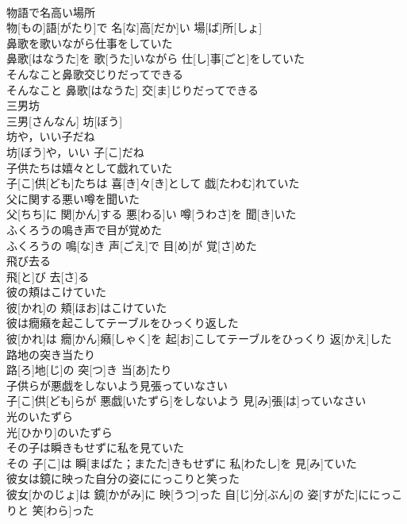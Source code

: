 \documentclass[8pt]{extreport}
\begin{document}
\begin{CJK}{UTF8}{min}
\\	物語で名高い場所	
\\	物[もの]語[がたり]で 名[な]高[だか]い 場[ば]所[しょ]
\\	鼻歌を歌いながら仕事をしていた	
\\	鼻歌[はなうた]を 歌[うた]いながら 仕[し]事[ごと]をしていた
\\	そんなこと鼻歌交じりだってできる	
\\	そんなこと 鼻歌[はなうた] 交[ま]じりだってできる
\\	三男坊	
\\	三男[さんなん] 坊[ぼう]
\\	坊や，いい子だね	
\\	坊[ぼう]や，いい 子[こ]だね
\\	子供たちは嬉々として戯れていた	
\\	子[こ]供[ども]たちは 喜[き]々[き]として 戯[たわむ]れていた
\\	父に関する悪い噂を聞いた	
\\	父[ちち]に 関[かん]する 悪[わる]い 噂[うわさ]を 聞[き]いた
\\	ふくろうの鳴き声で目が覚めた	
\\	ふくろうの 鳴[な]き 声[ごえ]で 目[め]が 覚[さ]めた
\\	飛び去る	
\\	飛[と]び 去[さ]る
\\	彼の頬はこけていた	
\\	彼[かれ]の 頬[ほお]はこけていた
\\	彼は癇癪を起こしてテーブルをひっくり返した	
\\	彼[かれ]は 癇[かん]癪[しゃく]を 起[お]こしてテーブルをひっくり 返[かえ]した
\\	路地の突き当たり	
\\	路[ろ]地[じ]の 突[つ]き 当[あ]たり
\\	子供らが悪戯をしないよう見張っていなさい	
\\	子[こ]供[ども]らが 悪戯[いたずら]をしないよう 見[み]張[は]っていなさい
\\	光のいたずら	
\\	光[ひかり]のいたずら
\\	その子は瞬きもせずに私を見ていた	
\\	その 子[こ]は 瞬[まばた；またた]きもせずに 私[わたし]を 見[み]ていた
\\	彼女は鏡に映った自分の姿ににっこりと笑った	
\\	彼女[かのじょ]は 鏡[かがみ]に 映[うつ]った 自[じ]分[ぶん]の 姿[すがた]ににっこりと 笑[わら]った

\end{CJK}
\end{document}
